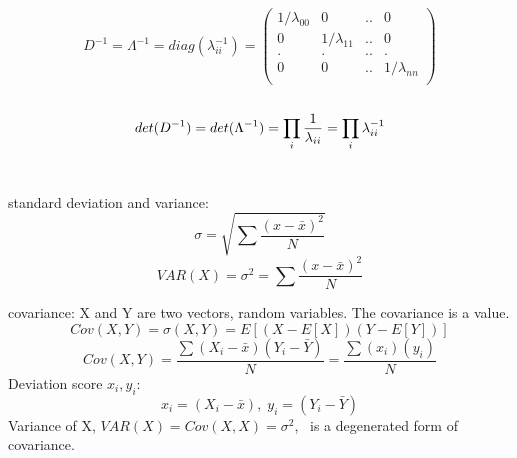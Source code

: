 \documentclass[a4paper,12pt]{article}
\begin{document}
\begin{compactitem}
\begin{equation}
\label{eq:pdpD}
D^{-1}=\Lambda^{-1}=diag(\lambda_{ii}^{-1})=
\begin{pmatrix}
       1/\lambda_{00}& 0 				& ..	&	0 	\\[0.3em]
       0 			& 1/\lambda_{11} & ..		&	0 	\\[0.3em]
       .			& .				& ..	&	.	\\[0.3em]
       0 			& 0 			& ..	&	1/\lambda_{nn}\\[0.3em]
\end{pmatrix}
\end{equation}\\
\begin{equation}
\label{eq:det-pdpD}
\\
det(D^{-1})=det(\Lambda^{-1})=
\prod_{i}^{} \frac{1}{\lambda_{ii} }\\
=\prod_{i}^{} \lambda_{ii}^{-1} \\
\end{equation}\\

\item standard deviation and variance:
\begin{equation}
\label{eq:std}
\sigma = \sqrt {\sum \frac{(x-\bar{x})^2}{N}}
\end{equation}
\begin{equation}
\label{eq:variance}
VAR(X)=\sigma^{2} = {\sum \frac{(x-\bar{x})^2}{N}}
\end{equation}

\item covariance: X and Y are two vectors, random variables. The covariance is a value.
\begin{equation}
\label{eq:covar}
Cov(X,Y)=\sigma(X,Y)=E[(X - E[X])(Y-E[Y])]
\end{equation}
\begin{equation}
\label{eq:covar1}
Cov(X,Y)=\frac{\sum(X_i-\bar{x})(Y_i-\bar{Y})}{N}=
\frac{\sum(x_i)(y_i)}{N}
\end{equation}
Deviation score $x_i, y_i$:
\begin{equation}
\label{eq:covar1}
x_{i}=(X_i-\bar{x}),\;
y_{i}=(Y_i-\bar{Y})
\end{equation}
Variance of X, $VAR(X)=Cov(X,X)=\sigma^{2}$, \ is a degenerated form of covariance.\\


\end{compactitem}
\end{document}
